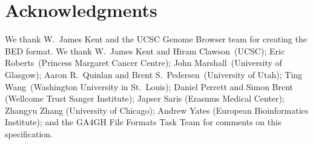 \documentclass[11pt]{article}
\begin{document}
\begin{acronym}
\end{acronym}

\section{Acknowledgments}

We thank W.~James Kent and the \ac{UCSC} Genome Browser team for creating the \ac{BED} format.
We thank W.~James Kent and Hiram Clawson~(\ac{UCSC}); Eric Roberts~(Princess Margaret Cancer Centre); John Marshall~(University of Glasgow); Aaron R.~Quinlan and Brent S.~Pedersen~(University of Utah); Ting Wang~(Washington University in St.~Louis); Daniel Perrett and Simon Brent (Wellcome Trust Sanger Institute); Japser Saris (Erasmus Medical Center); Zhangyu Zhang (University of Chicago); Andrew Yates (European Bioinformatics Institute); and the \ac{GA4GH} File Formats Task Team for comments on this specification.
\end{document}
